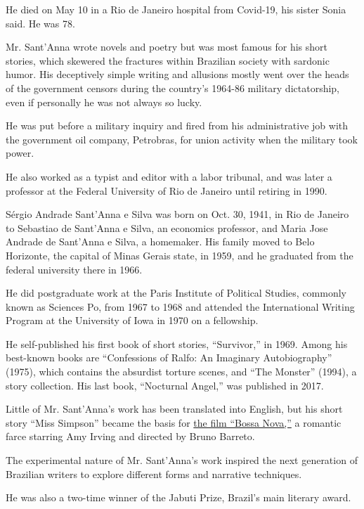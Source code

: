 He died on May 10 in a Rio de Janeiro hospital from Covid-19, his sister
Sonia said. He was 78.

Mr. Sant'Anna wrote novels and poetry but was most famous for his short
stories, which skewered the fractures within Brazilian society with
sardonic humor. His deceptively simple writing and allusions mostly went
over the heads of the government censors during the country's 1964-86
military dictatorship, even if personally he was not always so lucky.

He was put before a military inquiry and fired from his administrative
job with the government oil company, Petrobras, for union activity when
the military took power.

He also worked as a typist and editor with a labor tribunal, and was
later a professor at the Federal University of Rio de Janeiro until
retiring in 1990.

Sérgio Andrade Sant'Anna e Silva was born on Oct. 30, 1941, in Rio de
Janeiro to Sebastiao de Sant'Anna e Silva, an economics professor, and
Maria Jose Andrade de Sant'Anna e Silva, a homemaker. His family moved
to Belo Horizonte, the capital of Minas Gerais state, in 1959, and he
graduated from the federal university there in 1966.

He did postgraduate work at the Paris Institute of Political Studies,
commonly known as Sciences Po, from 1967 to 1968 and attended the
International Writing Program at the University of Iowa in 1970 on a
fellowship.

He self-published his first book of short stories, ``Survivor,'' in
1969. Among his best-known books are ``Confessions of Ralfo: An
Imaginary Autobiography'' (1975), which contains the absurdist torture
scenes, and ``The Monster'' (1994), a story collection. His last book,
``Nocturnal Angel,'' was published in 2017.

Little of Mr. Sant'Anna's work has been translated into English, but his
short story ``Miss Simpson'' became the basis for
\href{https://www.nytimes.com/2000/04/28/movies/film-review-sleepwalking-to-dreamy-rhythms-in-sumptuous-rio.html}{the
film ``Bossa Nova,''} a romantic farce starring Amy Irving and directed
by Bruno Barreto.

The experimental nature of Mr. Sant'Anna's work inspired the next
generation of Brazilian writers to explore different forms and narrative
techniques.

He was also a two-time winner of the Jabuti Prize, Brazil's main
literary award.

